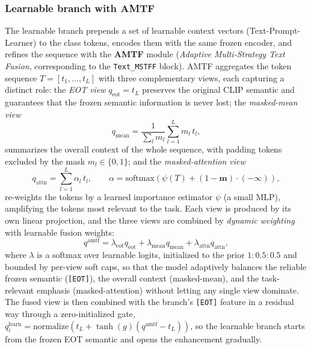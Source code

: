 \subsubsection{Learnable branch with AMTF}
The learnable branch prepends a set of learnable context vectors (Text-Prompt-Learner) to the class tokens, encodes them with the same frozen encoder, and refines the sequence with the \textbf{AMTF} module (\emph{Adaptive Multi-Strategy Text Fusion}, corresponding to the \texttt{Text\_MSTFF} block).
AMTF aggregates the token sequence $T = [t_1, \dots, t_L]$ with three complementary views, each capturing a distinct role: the \emph{EOT view} $q_{\text{eot}} = t_L$ preserves the original CLIP semantic and guarantees that the frozen semantic information is never lost; the \emph{masked-mean view}
\begin{equation}
  q_{\text{mean}} = \frac{1}{\sum_l m_l} \sum_{l=1}^{L} m_l \, t_l,
  \label{eq:amtf-mean}
\end{equation}
summarizes the overall context of the whole sequence, with padding tokens excluded by the mask $m_l \in \{0,1\}$; and the \emph{masked-attention view}
\begin{equation}
  q_{\text{attn}} = \sum_{l=1}^{L} \alpha_l \, t_l, \qquad
  \alpha = \mathrm{softmax}\!\left( \psi(T) + (1 - \mathbf{m}) \cdot (-\infty) \right),
  \label{eq:amtf-attn}
\end{equation}
re-weights the tokens by a learned importance estimator $\psi$ (a small MLP), amplifying the tokens most relevant to the task.
Each view is produced by its own linear projection, and the three views are combined by \emph{dynamic weighting} with learnable fusion weights:
\begin{equation}
  q^{\text{amtf}} = \lambda_{\text{eot}} q_{\text{eot}} + \lambda_{\text{mean}} q_{\text{mean}} + \lambda_{\text{attn}} q_{\text{attn}},
  \label{eq:amtf-fuse}
\end{equation}
where $\lambda$ is a softmax over learnable logits, initialized to the prior $1 : 0.5 : 0.5$ and bounded by per-view soft caps, so that the model adaptively balances the reliable frozen semantic (\texttt{[EOT]}), the overall context (masked-mean), and the task-relevant emphasis (masked-attention) without letting any single view dominate.
The fused view is then combined with the branch's \texttt{[EOT]} feature in a residual way through a zero-initialized gate,
$q^{\text{learn}}_i = \mathrm{normalize}\!\left( t_L + \tanh(g) ( q^{\text{amtf}} - t_L ) \right)$, so the learnable branch starts from the frozen EOT semantic and opens the enhancement gradually.

